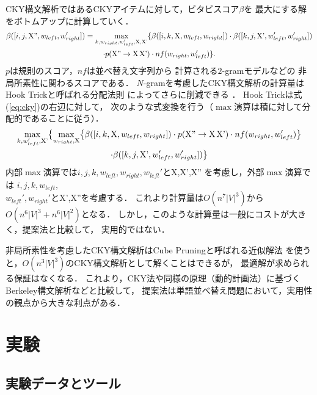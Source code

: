 \documentclass[japanese]{jnlp_1.4}
\begin{document}
CKY構文解析ではあるCKYアイテムに対して，ビタビスコア$\beta$を
最大にする解をボトムアップに計算していく．
\begin{multline}
\beta([i,j,\text{X''},w_{left},w_{right}'])
	= \max_{k,w_{right},w_{left}',\text{X},\text{X'}}
	\{
	\beta([i,k,\text{X},w_{left},w_{right}])\cdot
	\beta([k,j,\text{X'},w_{left}',w_{right}'])\\
\cdot p(\text{X''}\rightarrow\text{X}\hspace{0.5mm}\text{X'})\cdot
	nf(w_{right},w_{left}')\}.
\label{eq:cky}
\end{multline}
$p$は規則のスコア，$nf$は並べ替え文字列から
計算される$2$-gramモデルなどの
非局所素性に関わるスコアである．
$N$-gramを考慮したCKY構文解析の計算量は
Hook Trickと呼ばれる分配法則
によってさらに削減できる \cite{huang-zhang-gildea:2005:IWPT}．
Hook Trickは式(\ref{eq:cky})の右辺に対して，
次のような式変換を行う（$\max$演算は積に対して分配的であることに従う）．
\pagebreak
\begin{multline}
\max_{k,w_{left}',\text{X'}}\bigl\{\max_{w_{right},\text{X}}\bigl\{
	\beta([i,k,\text{X},w_{left},w_{right}])\cdot
	p(\text{X''}\rightarrow\text{X}\hspace{0.5mm}\text{X'})\cdot
	nf(w_{right},w_{left}')\bigr\}  \\
\cdot\beta([k,j,\text{X'},w_{left}',w_{right}'])\bigr\}
\end{multline}
内部$\max$演算では$i,j,k,w_{left},w_{right},w_{left}'$とX,X',X''
を考慮し，外部$\max$演算では
$i,j,k,w_{left},$\\$w_{left}',w_{right}'$とX',X''を考慮する．
これより計算量は$O(n^7|V|^3)$から$O(n^6|V|^3+n^6|V|^2)$となる．
しかし，このような計算量は一般にコストが大きく，提案法と比較して，
実用的ではない．

非局所素性を考慮したCKY構文解析はCube Pruningと呼ばれる近似解法 \cite{Huang:07}
を使うと，$O(n^3|V|^3)$のCKY構文解析として解くことはできるが，
最適解が求められる保証はなくなる．
これより，CKY法や同様の原理（動的計画法）に基づくBerkeley構文解析などと比較して，
提案法は単語並べ替え問題において，実用性の観点から大きな利点がある．


\section{実験}

\subsection{実験データとツール}
\end{document}
